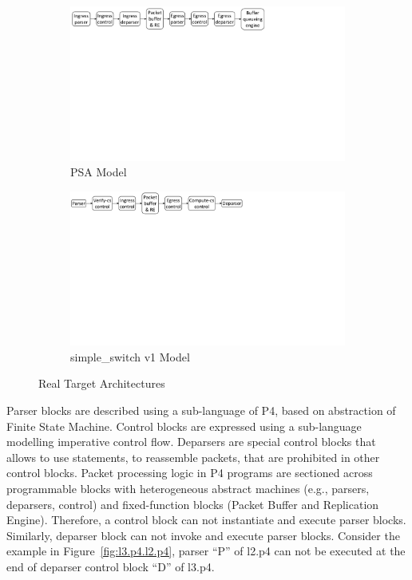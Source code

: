 \documentclass{hotnets19}
\begin{document}
\begin{figure}
    \begin{subfigure}{\linewidth}
        \centering
        \includegraphics[trim=7 450 281 0, clip,scale=0.36]{psa-pipeline.pdf}
        \caption{PSA Model}
        \label{subfig:psa-model}
    \end{subfigure}
    \begin{subfigure}[b]{\linewidth}
        \centering
        \includegraphics[trim=3 460 357 0, clip,scale=0.35]{v1model-pipeline.pdf}
        \caption{simple\_switch v1 Model}
        \label{subfig:v1model}
    \end{subfigure}
\caption{Real Target Architectures}
\label{fig:real-target-architectures}
\end{figure}


Parser blocks are described using a sub-language of P4, based on abstraction of Finite State Machine.
Control blocks are expressed using a sub-language modelling imperative control flow.
Deparsers are special control blocks that allows to use statements, to reassemble packets, that are prohibited in other control blocks.
Packet processing logic in P4 programs are sectioned across programmable blocks with heterogeneous abstract machines (e.g., parsers, deparsers, control) and fixed-function blocks (Packet Buffer and Replication Engine).
Therefore, a control block can not instantiate and execute parser blocks. Similarly, deparser block can not invoke and execute parser blocks.  
Consider the example in Figure~\ref{fig:l3.p4.l2.p4}, parser ``P'' of l2.p4 can not be executed at the end of deparser control block ``D'' of l3.p4.
\end{document}
